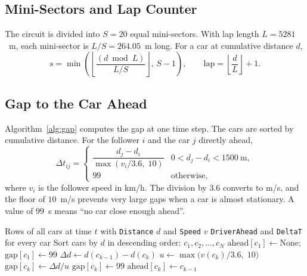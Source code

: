 \documentclass[11pt,a4paper]{article}
\newcommand{\dt}{\Delta t}
\begin{document}
\subsection{Mini-Sectors and Lap Counter}
The circuit is divided into $S = 20$ equal mini-sectors. With lap length
$L = 5281$~m, each mini-sector is $L/S = 264.05$~m long. For a car at
cumulative distance $d$,
\begin{equation}
s = \min\!\left(\left\lfloor \frac{(d \bmod L)}{L/S} \right\rfloor,\, S-1\right), \qquad
\text{lap} = \left\lfloor \frac{d}{L} \right\rfloor + 1.
\end{equation}

\subsection{Gap to the Car Ahead}
Algorithm~\ref{alg:gap} computes the gap at one time step. The cars are sorted
by cumulative distance. For the follower $i$ and the car $j$ directly ahead,
\begin{equation}
\dt_{ij} =
\begin{cases}
\dfrac{d_j - d_i}{\max(v_i/3.6,\;10)} & 0 < d_j - d_i < 1500\ \text{m},\\[2mm]
99 & \text{otherwise},
\end{cases}
\end{equation}
where $v_i$ is the follower speed in km/h. The division by $3.6$ converts to
m/s, and the floor of $10$~m/s prevents very large gaps when a car is almost
stationary. A value of $99$~s means ``no car close enough ahead''.

\begin{algorithm}[H]
\caption{Gap to the car ahead at one time step}
\label{alg:gap}
\begin{algorithmic}[1]
\Require Rows of all cars at time $t$ with \texttt{Distance} $d$ and \texttt{Speed} $v$
\Ensure \texttt{DriverAhead} and \texttt{DeltaT} for every car
\State Sort cars by $d$ in descending order: $c_1, c_2, \dots, c_N$
\State $\text{ahead}[c_1] \gets \text{None}$; \quad $\text{gap}[c_1] \gets 99$
  \State $\Delta d \gets d(c_{k-1}) - d(c_k)$
  \State $u \gets \max\bigl(v(c_k)/3.6,\; 10\bigr)$
    \State $\text{gap}[c_k] \gets \Delta d / u$
  \Else
    \State $\text{gap}[c_k] \gets 99$
  \EndIf
  \State $\text{ahead}[c_k] \gets c_{k-1}$
\EndFor
\end{algorithmic}
\end{algorithm}
\end{document}

